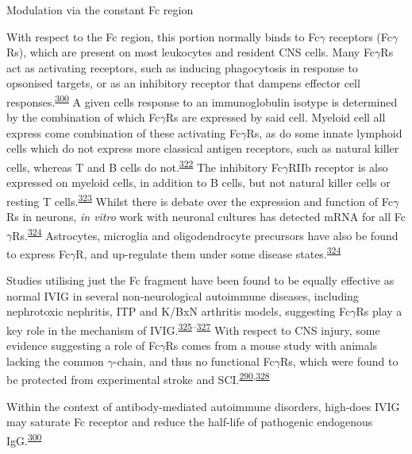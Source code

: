 \documentclass[
]{article}
\begin{document}
Modulation via the constant Fc region

With respect to the Fc region, this portion normally binds to Fc\(\gamma\) receptors (Fc\(\gamma\)Rs), which are present on most leukocytes and resident CNS cells.
Many Fc\(\gamma\)Rs act as activating receptors, such as inducing phagocytosis in response to opsonised targets, or as an inhibitory receptor that dampens effector cell responses.\textsuperscript{\protect\hyperlink{ref-schwab_intravenous_2013}{300}}
A given cells response to an immunoglobulin isotype is determined by the combination of which Fc\(\gamma\)Rs are expressed by said cell.
Myeloid cell all express come combination of these activating Fc\(\gamma\)Rs, as do some innate lymphoid cells which do not express more classical antigen receptors, such as natural killer cells, whereas T and B cells do not.\textsuperscript{\protect\hyperlink{ref-perussia_murine_1989}{322}}
The inhibitory Fc\(\gamma\)RIIb receptor is also expressed on myeloid cells, in addition to B cells, but not natural killer cells or resting T cells.\textsuperscript{\protect\hyperlink{ref-bruhns_mouse_2015}{323}}
Whilst there is debate over the expression and function of Fc\(\gamma\)Rs in neurons, \emph{in vitro} work with neuronal cultures has detected mRNA for all Fc\(\gamma\)Rs.\textsuperscript{\protect\hyperlink{ref-thom_therapeutic_2017}{324}}
Astrocytes, microglia and oligodendrocyte precursors have also be found to express Fc\(\gamma\)R, and up-regulate them under some disease states.\textsuperscript{\protect\hyperlink{ref-thom_therapeutic_2017}{324}}

Studies utilising just the Fc fragment have been found to be equally effective as normal IVIG in several non-neurological autoimmune diseases, including nephrotoxic nephritis, ITP and K/BxN arthritis models, suggesting Fc\(\gamma\)Rs play a key role in the mechanism of IVIG.\textsuperscript{\protect\hyperlink{ref-samuelsson_anti-inflammatory_2001}{325}--\protect\hyperlink{ref-kaneko_pathology_2006}{327}}
With respect to CNS injury, some evidence suggesting a role of Fc\(\gamma\)Rs comes from a mouse study with animals lacking the common \(\gamma\)-chain, and thus no functional Fc\(\gamma\)Rs, which were found to be protected from experimental stroke and SCI.\textsuperscript{\protect\hyperlink{ref-ankeny_b_2009}{290},\protect\hyperlink{ref-komine-kobayashi_dual_2004}{328}}

Within the context of antibody-mediated autoimmune disorders, high-does IVIG may saturate Fc receptor and reduce the half-life of pathogenic endogenous IgG.\textsuperscript{\protect\hyperlink{ref-schwab_intravenous_2013}{300}}
\end{document}

